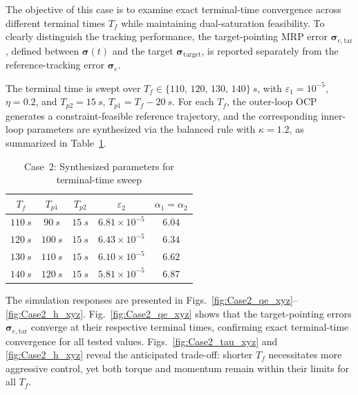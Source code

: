 \documentclass[journal]{new-aiaa}
\begin{document}
The objective of this case is to examine exact terminal-time convergence across different terminal times $T_f$ while maintaining dual-saturation feasibility.
To clearly distinguish the tracking performance, the target-pointing MRP error $\boldsymbol{\sigma}_{e,\mathrm{tar}}$, 
defined between $\boldsymbol{\sigma}(t)$ and the target $\boldsymbol{\sigma}_{\mathrm{target}}$, is reported separately from the reference-tracking error $\boldsymbol{\sigma}_e$.

The terminal time is swept over $T_f\in\{110,\,120,\,130,\,140\}~\si{s}$, with $\varepsilon_1=10^{-5}$, $\eta=0.2$, and $T_{p2}=\SI{15}{s}$, $T_{p1}=T_f-\SI{20}{s}$.
For each $T_f$, the outer-loop OCP generates a constraint-feasible reference trajectory, and the corresponding inner-loop parameters are synthesized via the balanced rule with $\kappa=1.2$, as summarized in Table~\ref{tab:case2_params}.

\begin{table}[htbp]
\centering
\caption{Case~2: Synthesized parameters for terminal-time sweep}
\label{tab:case2_params}
\begin{tabular}{@{}c c c c c@{}}
\toprule
$T_f$ & $T_{p1}$ & $T_{p2}$ & $\varepsilon_2$ & $\alpha_1=\alpha_2$ \\
\midrule
$\SI{110}{s}$ & $\SI{90}{s}$  & $\SI{15}{s}$ & $6.81\times10^{-5}$ & $6.04$ \\
$\SI{120}{s}$ & $\SI{100}{s}$ & $\SI{15}{s}$ & $6.43\times10^{-5}$ & $6.34$ \\
$\SI{130}{s}$ & $\SI{110}{s}$ & $\SI{15}{s}$ & $6.10\times10^{-5}$ & $6.62$ \\
$\SI{140}{s}$ & $\SI{120}{s}$ & $\SI{15}{s}$ & $5.81\times10^{-5}$ & $6.87$ \\
\bottomrule
\end{tabular}
\end{table}

The simulation responses are presented in Figs.~\ref{fig:Case2_qe_xyz}--\ref{fig:Case2_h_xyz}.
Fig.~\ref{fig:Case2_qe_xyz} shows that the target-pointing errors $\boldsymbol{\sigma}_{e,\mathrm{tar}}$ converge at their respective terminal times, confirming exact terminal-time convergence for all tested values.
Figs.~\ref{fig:Case2_tau_xyz} and \ref{fig:Case2_h_xyz} reveal the anticipated trade-off: shorter $T_f$ necessitates more aggressive control, yet both torque and momentum remain within their limits for all $T_f$.
\end{document}
